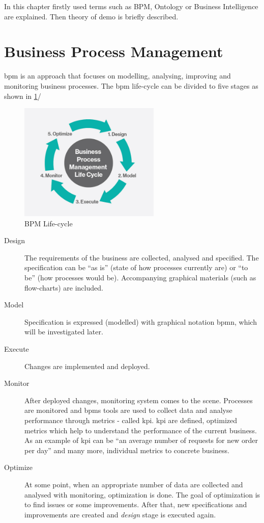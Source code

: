 In this chapter firstly used terms such as BPM, Ontology or Business Intelligence are explained. Then theory of \gls{demo} is briefly described.

\section{Business Process Management}
\gls{bpm} is an approach that focuses on modelling, analysing, improving and monitoring business processes. 
The \gls{bpm} life-cycle can be divided to five stages as shown in \cref{fig:bpm-lifecycle}/

\begin{figure}[ht!]
	\centering
    \includegraphics[width=0.6\textwidth, keepaspectratio]{img/bpm-lifecycle.jpg}
    \caption{BPM Life-cycle\cite{harvey-koeppel-bpm-lifecycle-2015}}
    \label{fig:bpm-lifecycle}
\end{figure}

\begin{description}
	\item[Design] The requirements of the business are collected, analysed and specified. The specification can be ``as is'' (state of how processes currently are) or ``to be'' (how processes would be). Accompanying graphical materials (such as flow-charts) are included.
    \item[Model] Specification is expressed (modelled) with graphical notation \gls{bpmn}, which will be investigated later.
    \item[Execute] Changes are implemented and deployed.
    \item[Monitor] After deployed changes, monitoring system comes to the scene. Processes are monitored and \gls{bpms} tools are used to collect data and analyse performance through metrics - called \gls{kpi}. \gls{kpi} are defined, optimized metrics which help to understand the performance of the current business. As an example of \gls{kpi} can be ``an average number of requests for new order per day'' and many more, individual metrics to concrete business.
    \item[Optimize] At some point, when an appropriate number of data are collected and analysed with monitoring, optimization is done. The goal of optimization is to find issues or some improvements. After that, new specifications and improvements are created and \textit{design} stage is executed again.
\end{description}

